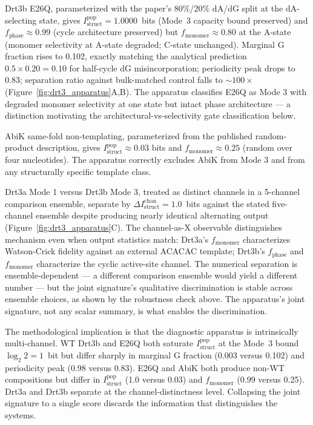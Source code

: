\documentclass[aps,prx,reprint,amsmath,amssymb,floatfix,superscriptaddress,nofootinbib]{revtex4-2}
\theoremstyle{plain-thm}
\theoremstyle{definition-thm}
\newcommand{\Istructpop}{I_{\mathrm{struct}}^{\mathrm{pop}}}
\newcommand{\Istructchan}{I_{\mathrm{struct}}^{\mathrm{chan}}}
\newcommand{\fphase}{f_{\mathrm{phase}}}
\newcommand{\fmonomer}{f_{\mathrm{monomer}}}
\begin{document}
Drt3b E26Q, parameterized with the paper's 80\%/20\% dA/dG split at the dA-selecting state, gives $\Istructpop = 1.0000$~bits (Mode~3 capacity bound preserved) and $\fphase \approx 0.99$ (cycle architecture preserved) but $\fmonomer \approx 0.80$ at the A-state (monomer selectivity at A-state degraded; C-state unchanged). Marginal G fraction rises to 0.102, exactly matching the analytical prediction $0.5 \times 0.20 = 0.10$ for half-cycle dG misincorporation; periodicity peak drops to 0.83; separation ratio against bulk-matched control falls to $\sim 100\times$ (Figure~\ref{fig:drt3_apparatus}A,B). The apparatus classifies E26Q as Mode 3 with degraded monomer selectivity at one state but intact phase architecture --- a distinction motivating the architectural-vs-selectivity gate classification below.

AbiK same-fold non-templating, parameterized from the published random-product description, gives $\Istructpop \approx 0.03$ bits and $\fmonomer \approx 0.25$ (random over four nucleotides). The apparatus correctly excludes AbiK from Mode 3 and from any structurally specific template class.

Drt3a Mode 1 versus Drt3b Mode 3, treated as distinct channels in a 5-channel comparison ensemble, separate by $\Delta\Istructchan = 1.0$~bits against the stated five-channel ensemble despite producing nearly identical alternating output (Figure~\ref{fig:drt3_apparatus}C). The channel-as-X observable distinguishes mechanism even when output statistics match: Drt3a's $\fmonomer$ characterizes Watson-Crick fidelity against an external ACACAC template; Drt3b's $\fphase$ and $\fmonomer$ characterize the cyclic active-site channel. The numerical separation is ensemble-dependent --- a different comparison ensemble would yield a different number --- but the joint signature's qualitative discrimination is stable across ensemble choices, as shown by the robustness check above. The apparatus's joint signature, not any scalar summary, is what enables the discrimination.

The methodological implication is that the diagnostic apparatus is intrinsically multi-channel. WT Drt3b and E26Q both saturate $\Istructpop$ at the Mode~3 bound $\log_2 2 = 1$~bit but differ sharply in marginal G fraction (0.003 versus 0.102) and periodicity peak (0.98 versus 0.83). E26Q and AbiK both produce non-WT compositions but differ in $\Istructpop$ (1.0 versus 0.03) and $\fmonomer$ (0.99 versus 0.25). Drt3a and Drt3b separate at the channel-distinctness level. Collapsing the joint signature to a single score discards the information that distinguishes the systems.
\end{document}
